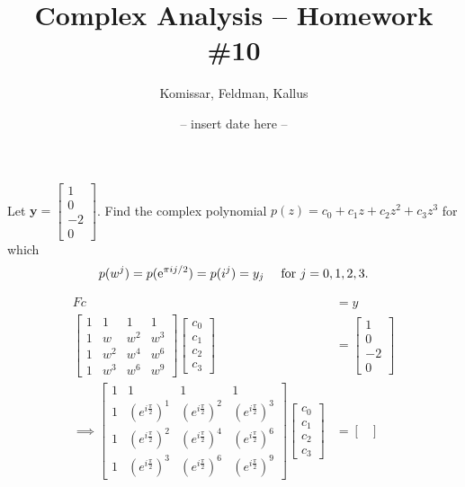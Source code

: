 \documentclass[11pt]{article}       %
\title{Complex Analysis -- Homework \#10}
\author{Komissar, Feldman, Kallus}
\date{ -- insert date here -- }
\theoremstyle{definition}
\begin{document}
\maketitle
\color{white}
\pagecolor{black}

  Let $\mathbf y =\left[ \begin{smallmatrix} 1 \\ 0 \\ -2 \\ 0 \end{smallmatrix} \right]$.  Find the complex polynomial $p(z) = c_0 + c_1z + c_2z^2 +c_3z^3$  for which
\[
p(w^j)=p( {\rm e}^{\pi i j/2} )= p( i^j )=y_j \quad \text{ for } j = 0, 1, 2, 3.
\]

\begin{align*}
    Fc &= y \\
    \begin{bmatrix}
        1 & 1 & 1 & 1 \\
        1 & w & w^2 & w^3 \\
        1 & w^2 & w^4 & w^6 \\
        1 & w^3 & w^6 & w^9
    \end{bmatrix}
    \begin{bmatrix}
        c_0 \\ c_1 \\ c_2 \\ c_3
    \end{bmatrix}
    &=
    \begin{bmatrix}
        1 \\ 0 \\ -2 \\ 0
    \end{bmatrix} \\
    \implies \begin{bmatrix}
        1 & 1 & 1 & 1 \\
        1 & (e^{i\frac{\pi}2})^1 & (e^{i\frac{\pi}2})^2 & (e^{i\frac{\pi}2})^3 \\
        1 & (e^{i\frac{\pi}2})^2 & (e^{i\frac{\pi}2})^4 & (e^{i\frac{\pi}2})^6 \\
        1 & (e^{i\frac{\pi}2})^3 & (e^{i\frac{\pi}2})^6 & (e^{i\frac{\pi}2})^9
    \end{bmatrix}
    \begin{bmatrix}
        c_0 \\ c_1 \\ c_2 \\ c_3
    \end{bmatrix}
    &=
    \begin{bmatrix}

\end{bmatrix}
\end{align*}
\end{document}
